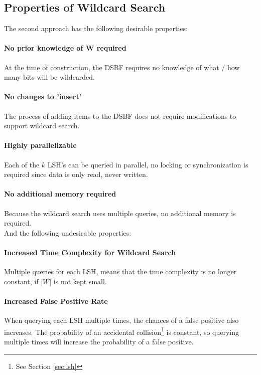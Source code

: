 \documentclass[a4paper,11pt]{article}
\begin{document}
\subsection{Properties of Wildcard Search}
The second approach has the following desirable properties:
\paragraph{No prior knowledge of W required} At the time of construction, the DSBF requires no knowledge of what / how many bits will be wildcarded.

\paragraph{No changes to 'insert'} The process of adding items to the DSBF does not require modifications to support wildcard search.

\paragraph{Highly parallelizable} Each of the $k$ LSH's can be queried in parallel, no locking or synchronization is required since data is only read, never written.

\paragraph{No additional memory required} Because the wildcard search uses multiple queries, no additional memory is required.
\\

And the following undesirable properties:
\paragraph{Increased Time Complexity for Wildcard Search} Multiple queries for each LSH, means that the time complexity is no longer constant, if $|W|$ is not kept small.

\paragraph{Increased False Positive Rate} When querying each LSH multiple times, the chances of a false positive also increases. The probability of an accidental collision\footnote{See Section \ref{sec:lsh}} is constant, so querying multiple times will increase the probability of a false positive.
\end{document}
